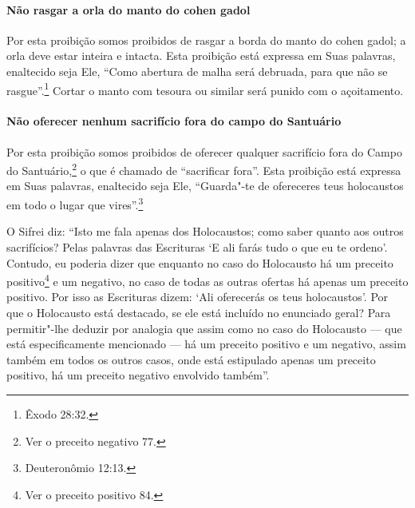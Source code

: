 \begin{multicols}{2}
\paragraph{Não rasgar a orla do manto do cohen gadol\starr{}}

Por esta proibição somos proibidos de rasgar a borda do manto do cohen
gadol\starr; a orla deve estar inteira e intacta. Esta proibição está
expressa em Suas palavras, enaltecido seja Ele, ``Como abertura de malha
será debruada, para que não se rasgue''.\footnote{Êxodo 28:32.} Cortar o manto
com tesoura ou similar será punido com o açoitamento.

\paragraph{Não oferecer nenhum sacrifício fora do campo do Santuário}

Por esta proibição somos proibidos de oferecer qualquer sacrifício fora
do Campo do Santuário,\footnote{Ver o preceito negativo 77.} o que é chamado de
``sacrificar fora''. Esta proibição está expressa em Suas palavras,
enaltecido seja Ele, ``Guarda"-te de ofereceres teus holocaustos em todo
o lugar que vires''.\footnote{Deuteronômio 12:13.}

O Sifrei\starr{} diz: ``Isto me fala apenas dos Holocaustos; como saber quanto
aos outros sacrifícios? Pelas palavras das Escrituras `E ali farás tudo
o que eu te ordeno'. Contudo, eu poderia dizer que enquanto no caso do
Holocausto há um preceito positivo\footnote{Ver o preceito positivo 84.} e um negativo,
no caso de todas as outras ofertas há apenas um preceito positivo. Por
isso as Escrituras dizem: `Ali oferecerás os teus holocaustos'. Por que
o Holocausto está destacado, se ele está incluído no enunciado geral?
Para permitir"-lhe deduzir por analogia que assim como no caso do
Holocausto --- que está especificamente mencionado --- há um preceito
positivo e um negativo, assim também em todos os outros casos, onde está
estipulado apenas um preceito positivo, há um preceito negativo
envolvido também''.


\end{multicols}
